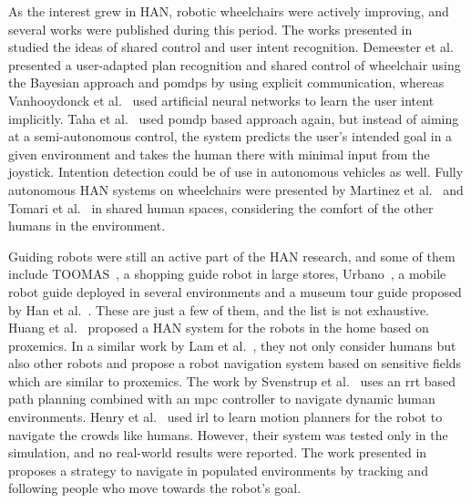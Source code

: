 As the interest grew in HAN, robotic wheelchairs were actively improving, and several works were published during this period. The works presented in ~\cite{demeester2008user, taha2008intention, vanhooydonck2010adaptable} studied the ideas of shared control and user intent recognition. Demeester et al.~\cite{demeester2008user} presented a user-adapted plan recognition and shared control of wheelchair using the Bayesian approach and \acrshort{pomdp}s by using explicit communication, whereas Vanhooydonck et al.~\cite{vanhooydonck2010adaptable} used artificial neural networks to learn the user intent implicitly. Taha et al.~\cite{taha2008intention} used \acrshort{pomdp} based approach again, but instead of aiming at a semi-autonomous control, the system predicts the user’s intended goal in a given environment and takes the human there with minimal input from the joystick. Intention detection could be of use in autonomous vehicles as well. Fully autonomous HAN systems on wheelchairs were presented by Martinez et al.~\cite{rios2012navigating} and Tomari et al.~\cite{tomari2012empirical} in shared human spaces, considering the comfort of the other humans in the environment.

Guiding robots were still an active part of the HAN research, and some of them include TOOMAS~\cite{gross2009toomas}, a shopping guide robot in large stores, Urbano~\cite{rodriguez2008urbano}, a mobile robot guide deployed in several environments and a museum tour guide proposed by Han et al.~\cite{han2010museum}. These are just a few of them, and the list is not exhaustive. Huang et al.~\cite{huang2010human} proposed a HAN system for the robots in the home based on proxemics. In a similar work by Lam et al.~\cite{lam2010human}, they not only consider humans but also other robots and propose a robot navigation system based on sensitive fields which are similar to proxemics. The work by Svenstrup et al.~\cite{svenstrup2010trajectory} uses an \acrshort{rrt} based path planning combined with an \acrshort{mpc} controller to navigate dynamic human environments. Henry et al.~\cite{henry2010learning} used \acrfull{irl} to learn motion planners for the robot to navigate the crowds like humans. However, their system was tested only in the simulation, and no real-world results were reported.  The work presented in ~\cite{muller2008socially} proposes a strategy to navigate in populated environments by tracking and following people who move towards the robot’s goal. 

